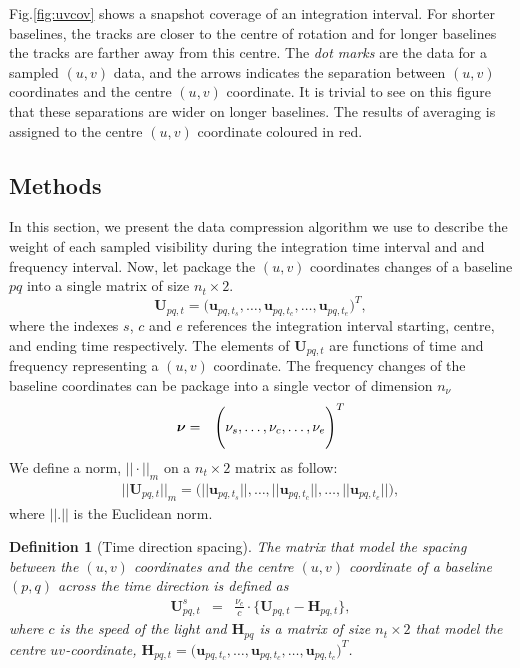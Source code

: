 \documentclass[useAMS,usenatbib]{mn2e}
\newtheorem{definition}[theorem]{Definition}
\begin{document}
Fig.\ref{fig:uvcov} shows a snapshot coverage of an integration interval. For shorter baselines, the tracks are closer to the centre of 
rotation and for longer baselines the tracks are farther away from this centre. The \textit{dot marks} are the data for a sampled $(u,v)$ 
data, and the  arrows indicates the separation between $(u,v)$ coordinates and the centre $(u,v)$ coordinate. It is trivial to see on this 
figure that these separations are wider on longer baselines. The results of averaging is assigned to the centre $(u,v)$ coordinate coloured 
in red. 
\subsection{Methods}
\label{sec:baseline1}
In this section, we present the data compression algorithm we use to describe the weight of each sampled visibility during the 
integration time interval and and frequency interval. Now, let package the $(u,v)$ coordinates changes of a baseline $pq$ into a single 
matrix of size $n_t \times 2$.
\begin{equation}
\mathbf{U}_{pq,t}= \Bigg(\mathbf{u}_{pq,t_s}, \dots , \mathbf{u}_{pq,t_c}, \dots, \mathbf{u}_{pq,t_e}\Bigg)^T,
\end{equation}
where the indexes $s$, $c$ and $e$ references the integration interval starting, centre, and ending time respectively. The 
elements of $\mathbf{U}_{pq,t}$ are functions of time and frequency representing a $(u,v)$ coordinate. The frequency changes of the 
baseline coordinates can be package into a single vector of dimension $n_{\nu}$ 
\begin{eqnarray*}
 \mbox{\boldmath $\nu$}&=&\Bigg(\nu_s,\dots,\nu_c,\dots,\nu_e\Bigg)^T
\end{eqnarray*}
We define a norm, $||\cdot||_{m}$ on a $n_t \times 2$ matrix as follow:
\begin{eqnarray}
||\textbf{U}_{pq,t}||_{m}=\Bigg(||\mathbf{u}_{pq,t_s}||, \dots , ||\mathbf{u}_{pq,t_c}||, \dots, ||\mathbf{u}_{pq,t_e}||\Bigg),
\end{eqnarray}
where $||.||$ is the Euclidean norm.
\begin{definition}[Time direction spacing]
\label{def:1}
The matrix that model the spacing between the $(u,v)$ coordinates and the centre $(u,v)$ coordinate of a baseline $(p,q)$ across the time 
direction is defined as
\begin{eqnarray*}
 \mathbf{U}_{pq,t}^{s} &=&\frac{\nu_c}{c}\cdot\Bigg\{\mathbf{U}_{pq,t}-\mathbf{H}_{pq,t} \Bigg \},
\end{eqnarray*}
where $c$ is the speed of the light and $\mathbf{H}_{pq}$ is a matrix of size $n_t \times 2$ that model the centre $uv$-coordinate,
$\mathbf{H}_{pq,t}= \big(\mathbf{u}_{pq,t_c}, \dots , \mathbf{u}_{pq,t_c}, \dots, \mathbf{u}_{pq,t_c}\big)^T$.
\end{definition}
\end{document}
